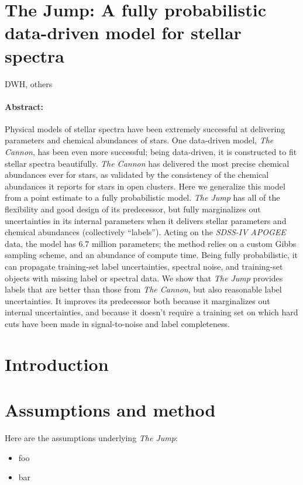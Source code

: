 \documentclass[12pt, letterpaper]{article}
\begin{document}
\thispagestyle{empty}\sloppy\sloppypar\raggedbottom\frenchspacing

\section*{The Jump: A fully probabilistic data-driven model for stellar spectra}

\noindent
DWH, others

\paragraph{Abstract:}
Physical models of stellar spectra have been extremely successful
at delivering parameters and chemical abundances of stars.
One data-driven model, \textsl{The Cannon}, has been even more
successful; being data-driven, it is constructed to fit stellar
spectra beautifully.
\textsl{The Cannon} has delivered the most precise chemical abundances ever for
stars, as validated by the consistency of the chemical abundances
it reports for stars in open clusters.
Here we generalize this model from a point estimate to a fully
probabilistic model.
\textsl{The Jump} has all of the flexibility and good design of
its predecessor, but fully marginalizes out uncertainties in its
internal parameters when it delivers stellar parameters and
chemical abundances (collectively ``labels'').
Acting on the \textsl{SDSS-IV} \textsl{APOGEE} data, the model
has 6.7 million parameters; the method relies on a custom Gibbs sampling
scheme, and an abundance of compute time.
Being fully probabilistic, it can propagate training-set label uncertainties,
spectral noise, and training-set objects with missing label or spectral data.
We show that \textsl{The Jump} provides labels that are better than those
from \textsl{The Cannon}, but also reasonable label uncertainties.
It improves its predecessor both because it marginalizes out internal
uncertainties, and because it doesn't require a training set on which
hard cuts have been made in signal-to-noise and label completeness.

\section{Introduction}

\section{Assumptions and method}

Here are the assumptions underlying \textsl{The Jump}:
\begin{itemize}\itemskip=0ex
\item foo
\item bar
\end{itemize}
\end{document}
